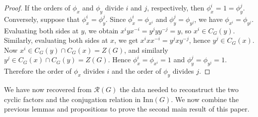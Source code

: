 \documentclass[a4paper,12pt]{article}
\theoremstyle{definition}
\theoremstyle{remark}
\begin{document}
\begin{proof}
  If the orders of $\phi_x$ and $\phi_y$ divide $i$ and $j$, respectively, then $\phi_x^i=1=\phi_y^j$. Conversely, suppose that $\phi_x^i=\phi_y^j$. Since $\phi_x^i=\phi_{x^i}$ and $\phi_y^j=\phi_{y^j}$, we have $\phi_{x^i}=\phi_{y^j}$. Evaluating both sides at $y$, we obtain $x^i y x^{-i}=y^j y y^{-j}=y$, so $x^i\in C_G(y)$. Similarly, evaluating both sides at $x$, we get $x^i x x^{-i}=y^j x y^{-j}$, hence $y^j\in C_G(x)$. Now $x^i\in C_G(y)\cap C_G(x)=Z(G)$, and similarly $y^j\in C_G(x)\cap C_G(y)=Z(G)$. Hence $\phi_x^i=\phi_{x^i}=1$ and $\phi_y^j=\phi_{y^j}=1$. Therefore the order of $\phi_x$ divides $i$ and the order of $\phi_y$ divides $j$.
\end{proof}



We have now recovered from $\mathcal{R}(G)$ the data needed to reconstruct the two cyclic factors and the conjugation relation in $\mathrm{Inn}(G)$. We now combine the previous lemmas and propositions to prove the second main result of this paper.
\end{document}
